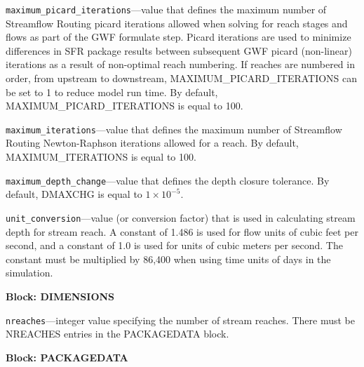 \begin{description}
\item \texttt{maximum\_picard\_iterations}---value that defines the maximum number of Streamflow Routing picard iterations allowed when solving for reach stages and flows as part of the GWF formulate step. Picard iterations are used to minimize differences in SFR package results between subsequent GWF picard (non-linear) iterations as a result of non-optimal reach numbering. If reaches are numbered in order, from upstream to downstream, MAXIMUM\_PICARD\_ITERATIONS can be set to 1 to reduce model run time. By default, MAXIMUM\_PICARD\_ITERATIONS is equal to 100.

\item \texttt{maximum\_iterations}---value that defines the maximum number of Streamflow Routing Newton-Raphson iterations allowed for a reach. By default, MAXIMUM\_ITERATIONS is equal to 100.

\item \texttt{maximum\_depth\_change}---value that defines the depth closure tolerance. By default, DMAXCHG is equal to $1 \times 10^{-5}$.

\item \texttt{unit\_conversion}---value (or conversion factor) that is used in calculating stream depth for stream reach. A constant of 1.486 is used for flow units of cubic feet per second, and a constant of 1.0 is used for units of cubic meters per second. The constant must be multiplied by 86,400 when using time units of days in the simulation.

\end{description}
\item \textbf{Block: DIMENSIONS}

\begin{description}
\item \texttt{nreaches}---integer value specifying the number of stream reaches.  There must be NREACHES entries in the PACKAGEDATA block.

\end{description}
\item \textbf{Block: PACKAGEDATA}

